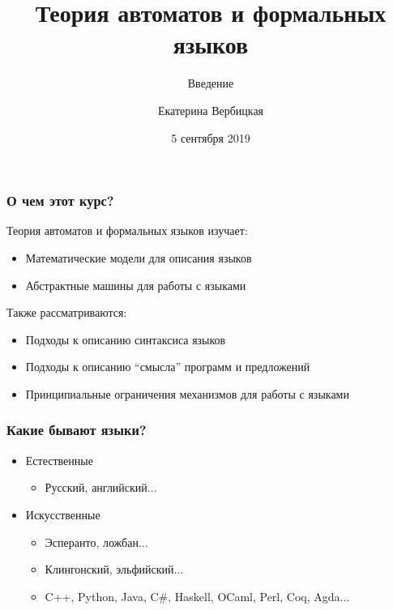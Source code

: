 \documentclass{beamer}
\title[]{Теория автоматов и формальных языков}
\subtitle[]{Введение}
\institute[]{
Санкт-Петербургский государственный электротехнический университет <<ЛЭТИ>>\\
}
\author[]{Екатерина Вербицкая}
\date{5 сентября 2019}
\begin{document}
{
  \begin{frame}
    \titlepage
  \end{frame}
}

\begin{frame}[fragile]
  \transwipe[direction=90]
  \frametitle{О чем этот курс?}
  Теория автоматов и формальных языков изучает:
  \begin{itemize}
    \item Математические модели для описания языков
    \item Абстрактные машины для работы с языками
  \end{itemize}
  
  Также рассматриваются:
  \begin{itemize}
    \item Подходы к описанию синтаксиса языков
    \item Подходы к описанию ``смысла'' программ и предложений
    \item Принципиальные ограничения механизмов для работы с языками
  \end{itemize}
\end{frame}

\begin{frame}[fragile]
  \transwipe[direction=90]
  \frametitle{Какие бывают языки?}
  \pause
  \begin{itemize}
    \item Естественные 
    \begin{itemize}
      \item Русский, английский...
    \end{itemize}    
    \pause
    \item Искусственные
    \begin{itemize}
      \item Эсперанто, ложбан...
      \item Клингонский, эльфийский...
      \pause
      \item C++, Python, Java, C\#, Haskell, OCaml, Perl, Coq, Agda...
    \end{itemize}
  \end{itemize}
\end{frame}
\end{document}
